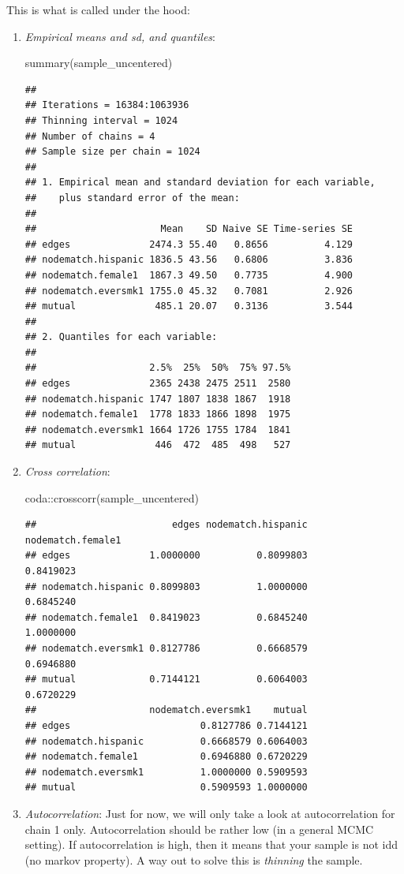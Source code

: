 \documentclass[
]{book}
\newenvironment{Shaded}{\begin{snugshade}}{\end{snugshade}}
\newcommand{\FunctionTok}[1]{\textcolor[rgb]{0.00,0.00,0.00}{#1}}
\newcommand{\NormalTok}[1]{#1}
\newcommand{\SpecialCharTok}[1]{\textcolor[rgb]{0.00,0.00,0.00}{#1}}
\begin{document}
This is what is called under the hood:

\begin{enumerate}
\def\labelenumi{\arabic{enumi}.}
\item
  \emph{Empirical means and sd, and quantiles}:

\begin{Shaded}
\begin{Highlighting}[]
\FunctionTok{summary}\NormalTok{(sample\_uncentered)}
\end{Highlighting}
\end{Shaded}

\begin{verbatim}
## 
## Iterations = 16384:1063936
## Thinning interval = 1024 
## Number of chains = 4 
## Sample size per chain = 1024 
## 
## 1. Empirical mean and standard deviation for each variable,
##    plus standard error of the mean:
## 
##                      Mean    SD Naive SE Time-series SE
## edges              2474.3 55.40   0.8656          4.129
## nodematch.hispanic 1836.5 43.56   0.6806          3.836
## nodematch.female1  1867.3 49.50   0.7735          4.900
## nodematch.eversmk1 1755.0 45.32   0.7081          2.926
## mutual              485.1 20.07   0.3136          3.544
## 
## 2. Quantiles for each variable:
## 
##                    2.5%  25%  50%  75% 97.5%
## edges              2365 2438 2475 2511  2580
## nodematch.hispanic 1747 1807 1838 1867  1918
## nodematch.female1  1778 1833 1866 1898  1975
## nodematch.eversmk1 1664 1726 1755 1784  1841
## mutual              446  472  485  498   527
\end{verbatim}
\item
  \emph{Cross correlation}:

\begin{Shaded}
\begin{Highlighting}[]
\NormalTok{coda}\SpecialCharTok{::}\FunctionTok{crosscorr}\NormalTok{(sample\_uncentered)}
\end{Highlighting}
\end{Shaded}

\begin{verbatim}
##                        edges nodematch.hispanic nodematch.female1
## edges              1.0000000          0.8099803         0.8419023
## nodematch.hispanic 0.8099803          1.0000000         0.6845240
## nodematch.female1  0.8419023          0.6845240         1.0000000
## nodematch.eversmk1 0.8127786          0.6668579         0.6946880
## mutual             0.7144121          0.6064003         0.6720229
##                    nodematch.eversmk1    mutual
## edges                       0.8127786 0.7144121
## nodematch.hispanic          0.6668579 0.6064003
## nodematch.female1           0.6946880 0.6720229
## nodematch.eversmk1          1.0000000 0.5909593
## mutual                      0.5909593 1.0000000
\end{verbatim}
\item
  \emph{Autocorrelation}: Just for now, we will only take a look at autocorrelation for chain 1 only. Autocorrelation should be rather low (in a general MCMC setting). If autocorrelation is high, then it means that your sample is not idd (no markov property). A way out to solve this is \emph{thinning} the sample.


\end{enumerate}
\end{document}
